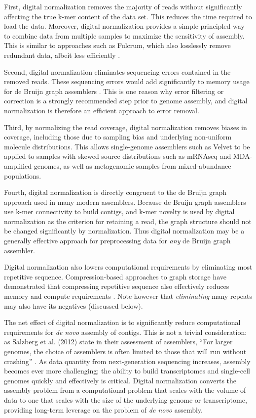 \documentclass[10pt]{article}
\begin{document}
First, digital normalization removes the majority of reads without
significantly affecting the true k-mer content of the data set.  This
reduces the time required to load the data.  Moreover, digital
normalization provides a simple principled way to combine data from
multiple samples to maximize the sensitivity of assembly.  This is
similar to approaches such as Fulcrum, which also losslessly remove
redundant data, albeit less efficiently \cite{pubmed22419786}.

Second, digital normalization eliminates sequencing errors contained
in the removed reads.  These sequencing errors would add significantly
to memory usage for de Bruijn graph assemblers \cite{pubmed21245053}.
This is one reason why error filtering or correction is a strongly
recommended step prior to genome assembly, and digital normalization
is therefore an efficient approach to error removal.

Third, by normalizing the read coverage, digital normalization
removes biases in coverage, including those due to sampling bias and
underlying non-uniform molecule distributions.  This allows
single-genome assemblers such as Velvet to be applied to samples with
skewed source distributions such as mRNAseq and MDA-amplified genomes,
as well as metagenomic samples from mixed-abundance populations.

Fourth, digital normalization is directly congruent to the de Bruijn
graph approach used in many modern assemblers\cite{pubmed20211242}.
Because de Bruijn graph assemblers use k-mer connectivity to build
contigs, and k-mer novelty is used by digital normalization as the
criterion for retaining a read, the graph structure should not be
changed significantly by normalization.  Thus digital normalization
may be a generally effective approach for preprocessing data for {\em
  any} de Bruijn graph assembler.

Digital normalization also lowers computational requirements by
eliminating most repetitive sequence.  Compression-based approaches to
graph storage have demonstrated that compressing repetitive sequence
also effectively reduces memory and compute requirements
\cite{pubmed22139935,pubmed22156294}.
Note however that {\em eliminating} many repeats may also
have its negatives (discussed below).


The net effect of digital normalization is to significantly reduce
computational requirements for {\em de novo} assembly of contigs.
This is not a trivial consideration: as Salzberg et al. (2012) state
in their assessment of assemblers, ``For larger genomes, the choice of
assemblers is often limited to those that will run without crashing''
\cite{pubmed22147368}.  As data quantity from next-generation
sequencing increases, assembly becomes ever more challenging; the
ability to build transcriptomes and single-cell genomes quickly and
effectively is critical.  Digital normalization converts the assembly
problem from a computational problem that scales with the volume of
data to one that scales with the size of the underlying genome or
transcriptome, providing long-term leverage on the problem of {\em de
  novo} assembly.
\end{document}
